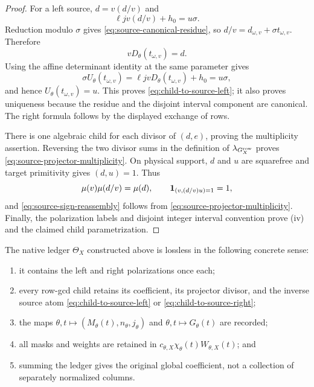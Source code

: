 \begin{proof}
For a left source, \(d=v(d/v)\) and
\[
 \ell jv(d/v)+h_0=u\sigma.
\]
Reduction modulo \(\sigma\) gives
\eqref{eq:source-canonical-residue}, so
\(d/v=d_{\omega,v}+\sigma t_{\omega,v}\).  Therefore
\[
 vD_\theta(t_{\omega,v})=d.
\]
Using the affine determinant identity at the same parameter gives
\[
 \sigma U_\theta(t_{\omega,v})
 =
 \ell jvD_\theta(t_{\omega,v})+h_0
 =
 u\sigma,
\]
and hence \(U_\theta(t_{\omega,v})=u\).  This proves
\eqref{eq:child-to-source-left}; it also proves uniqueness because
the residue and the disjoint interval component are canonical.  The
right formula follows by the displayed exchange of rows.

There is one algebraic child for each divisor of \((d,e)\), proving
the multiplicity assertion.  Reversing the two divisor sums in the
definition of \(\lambda_{G_X^{\rm row}}\) proves
\eqref{eq:source-projector-multiplicity}.  On physical support,
\(d\) and \(u\) are squarefree and target primitivity gives
\((d,u)=1\).  Thus
\[
 \mu(v)\mu(d/v)=\mu(d),\qquad
 \mathbf 1_{(v,(d/v)u)=1}=1,
\]
and \eqref{eq:source-sign-reassembly} follows from
\eqref{eq:source-projector-multiplicity}.  Finally, the polarization
labels and disjoint integer interval convention prove (iv) and the
claimed child parametrization.
\end{proof}

\begin{corollary}
\label{cor:constructed-ledger-lossless}
The native ledger \(\Theta_X\) constructed above is lossless in the
following concrete sense:
\begin{enumerate}[label=(\roman*),leftmargin=2.2em]
\item it contains the left and right polarizations once each;
\item every row-gcd child retains its coefficient, its projector
divisor, and the inverse source atom
\eqref{eq:child-to-source-left} or
\eqref{eq:child-to-source-right};
\item the maps
\(\theta,t\mapsto(M_\theta(t),n_\theta,j_\theta)\) and
\(\theta,t\mapsto G_\theta(t)\) are recorded;
\item all masks and weights are retained in
\(c_{\theta,X}\chi_\theta(t)W_{\theta,X}(t)\); and
\item summing the ledger gives the original global coefficient, not
a collection of separately normalized columns.
\end{enumerate}
\end{corollary}


